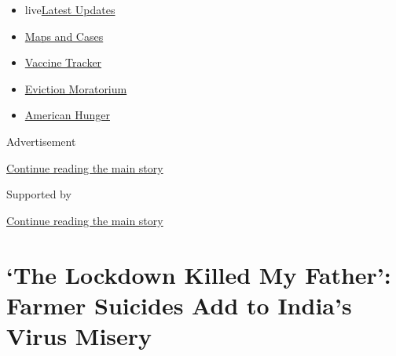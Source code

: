 \begin{itemize}
\tightlist
\item
  live\href{https://www.nytimes3xbfgragh.onion/2020/09/09/world/covid-19-coronavirus.html?name=styln-coronavirus-national\&region=TOP_BANNER\&block=storyline_menu_recirc\&action=click\&pgtype=Article\&impression_id=11499021-f284-11ea-ae55-8bacd3660bac\&variant=undefined}{Latest
  Updates}
\item
  \href{https://www.nytimes3xbfgragh.onion/interactive/2020/us/coronavirus-us-cases.html?name=styln-coronavirus-national\&region=TOP_BANNER\&block=storyline_menu_recirc\&action=click\&pgtype=Article\&impression_id=11499022-f284-11ea-ae55-8bacd3660bac\&variant=undefined}{Maps
  and Cases}
\item
  \href{https://www.nytimes3xbfgragh.onion/interactive/2020/science/coronavirus-vaccine-tracker.html?name=styln-coronavirus-national\&region=TOP_BANNER\&block=storyline_menu_recirc\&action=click\&pgtype=Article\&impression_id=11499023-f284-11ea-ae55-8bacd3660bac\&variant=undefined}{Vaccine
  Tracker}
\item
  \href{https://www.nytimes3xbfgragh.onion/2020/09/02/your-money/eviction-moratorium-covid.html?name=styln-coronavirus-national\&region=TOP_BANNER\&block=storyline_menu_recirc\&action=click\&pgtype=Article\&impression_id=1149b730-f284-11ea-ae55-8bacd3660bac\&variant=undefined}{Eviction
  Moratorium}
\item
  \href{https://www.nytimes3xbfgragh.onion/interactive/2020/09/02/magazine/food-insecurity-hunger-us.html?name=styln-coronavirus-national\&region=TOP_BANNER\&block=storyline_menu_recirc\&action=click\&pgtype=Article\&impression_id=1149b731-f284-11ea-ae55-8bacd3660bac\&variant=undefined}{American
  Hunger}
\end{itemize}

Advertisement

\protect\hyperlink{after-top}{Continue reading the main story}

Supported by

\protect\hyperlink{after-sponsor}{Continue reading the main story}

\hypertarget{the-lockdown-killed-my-father-farmer-suicides-add-to-indias-virus-misery}{%
\section{`The Lockdown Killed My Father': Farmer Suicides Add to India's
Virus
Misery}\label{the-lockdown-killed-my-father-farmer-suicides-add-to-indias-virus-misery}}

